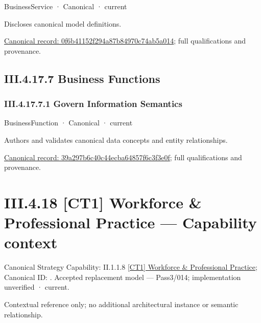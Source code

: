 \label{element:0f6b41152f294a87b84970c74ab5a014}
{\small BusinessService · Canonical · current}\par

Discloses canonical model definitions.


{\footnotesize \href{../../../../continuum/business/business-service/0f6b41152f294a87b84970c74ab5a014.md}{Canonical record: 0f6b41152f294a87b84970c74ab5a014}; full qualifications and provenance.}\par
\subsection*{III.4.17.7 Business Functions}
\label{navigation:III.4.17.7}

\subsubsection*{III.4.17.7.1 Govern Information Semantics}
\label{navigation:III.4.17.7.1}

\label{element:39a297b6c40c44ecba64857f6c3f3e0f}
{\small BusinessFunction · Canonical · current}\par

Authors and validates canonical data concepts and entity relationships.


{\footnotesize \href{../../../../continuum/business/business-function/39a297b6c40c44ecba64857f6c3f3e0f.md}{Canonical record: 39a297b6c40c44ecba64857f6c3f3e0f}; full qualifications and provenance.}\par
\section*{III.4.18 [CT1] Workforce \& Professional Practice — Capability context}
\label{navigation:III.4.18}

{\small Canonical Strategy Capability: II.1.1.8 \hyperref[element:4be7b3b9fd754a20890302153203d5a1]{[CT1] Workforce \& Professional Practice}; Canonical ID: \texttt{}. Accepted replacement model — Pass3/014; implementation unverified · current.}\par
Contextual reference only; no additional architectural instance or semantic relationship.\par
